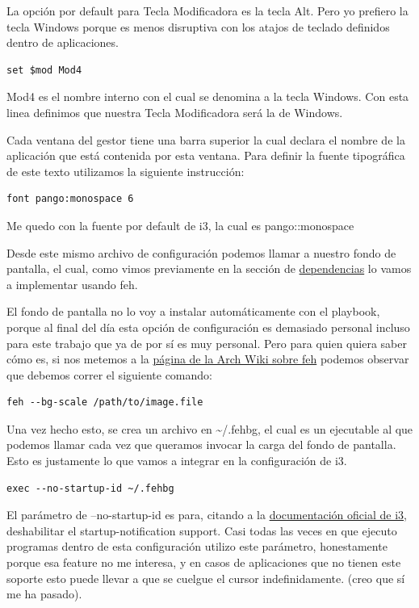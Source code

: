\documentclass[11pt]{article}
\begin{document}
La opción por default para Tecla Modificadora es la tecla Alt. Pero yo prefiero la tecla Windows porque es menos disruptiva con los atajos de teclado definidos dentro de aplicaciones.

\begin{verbatim}
set $mod Mod4
\end{verbatim}

Mod4 es el nombre interno con el cual se denomina a la tecla Windows. Con esta linea definimos que nuestra Tecla Modificadora será la de Windows.

Cada ventana del gestor tiene una barra superior la cual declara el nombre de la aplicación que está contenida por esta ventana. Para definir la fuente tipográfica de este texto utilizamos la siguiente instrucción:

\begin{verbatim}
font pango:monospace 6
\end{verbatim}

Me quedo con la fuente por default de i3, la cual es pango::monospace

Desde este mismo archivo de configuración podemos llamar a nuestro fondo de pantalla, el cual, como vimos previamente en la sección de \hyperref[sec:orgd831bf4]{dependencias} lo vamos a implementar usando feh.

El fondo de pantalla no lo voy a instalar automáticamente con el playbook, porque al final del día esta opción de configuración es demasiado personal incluso para este trabajo que ya de por sí es muy personal. Pero para quien quiera saber cómo es, si nos metemos a la \href{https://wiki.archlinux.org/title/Feh}{página de la Arch Wiki sobre feh} podemos observar que debemos correr el siguiente comando:

\begin{verbatim}
feh --bg-scale /path/to/image.file
\end{verbatim}

Una vez hecho esto, se crea un archivo en \textasciitilde{}/.fehbg, el cual es un ejecutable al que podemos llamar cada vez que queramos invocar la carga del fondo de pantalla. Esto es justamente lo que vamos a integrar en la configuración de i3.

\begin{verbatim}
exec --no-startup-id ~/.fehbg
\end{verbatim}

El parámetro de --no-startup-id es para, citando a la \href{https://i3wm.org/docs/userguide.html\#exec}{documentación oficial de i3}, deshabilitar el startup-notification support. Casi todas las veces en que ejecuto programas dentro de esta configuración utilizo este parámetro, honestamente porque esa feature no me interesa, y en casos de aplicaciones que no tienen este soporte esto puede llevar a que se cuelgue el cursor indefinidamente. (creo que sí me ha pasado).
\end{document}

